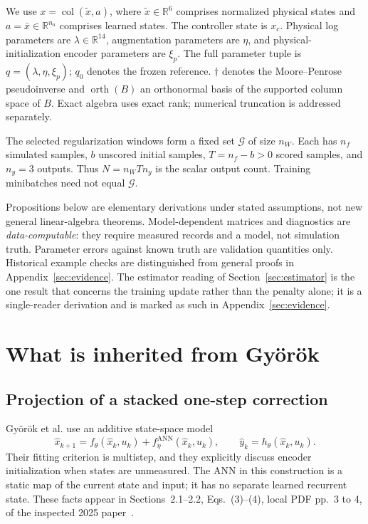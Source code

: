 \documentclass[11pt,a4paper]{article}
\newcommand{\R}{\mathbb R}
\newcommand{\orth}{\operatorname{orth}}
\newcommand{\col}{\operatorname{col}}
\theoremstyle{remark}
\begin{document}
We use $x=\col(\tilde x,a)$, where $\tilde x\in\R^6$ comprises normalized physical states and $a=\bar x\in\R^{n_a}$ comprises learned states. The controller state is $x_c$. Physical log parameters are $\lambda\in\R^{14}$, augmentation parameters are $\eta$, and physical-initialization encoder parameters are $\xi_p$. The full parameter tuple is $q=(\lambda,\eta,\xi_p)$; $q_0$ denotes the frozen reference. $\dagger$ denotes the Moore--Penrose pseudoinverse and $\orth(B)$ an orthonormal basis of the supported column space of $B$. Exact algebra uses exact rank; numerical truncation is addressed separately.

The selected regularization windows form a fixed set $\mathcal G$ of size $n_W$. Each has $n_f$ simulated samples, $b$ unscored initial samples, $T=n_f-b>0$ scored samples, and $n_y=3$ outputs. Thus $N=n_W Tn_y$ is the scalar output count. Training minibatches need not equal $\mathcal G$.

Propositions below are elementary derivations under stated assumptions, not new general linear-algebra theorems. Model-dependent matrices and diagnostics are \emph{data-computable}: they require measured records and a model, not simulation truth. Parameter errors against known truth are validation quantities only. Historical example checks are distinguished from general proofs in Appendix~\ref{sec:evidence}. The estimator reading of Section~\ref{sec:estimator} is the one result that concerns the training update rather than the penalty alone; it is a single-reader derivation and is marked as such in Appendix~\ref{sec:evidence}.

\section{What is inherited from Gy\"or\"ok}
\subsection{Projection of a stacked one-step correction}
Gy\"or\"ok et al. use an additive state-space model
\begin{equation}\label{eq:original-model}
 \hat x_{k+1}=f_\theta(\hat x_k,u_k)+f^{\mathrm{ANN}}_\eta(\hat x_k,u_k),
 \qquad \hat y_k=h_\theta(\hat x_k,u_k).
\end{equation}
Their fitting criterion is multistep, and they explicitly discuss encoder initialization when states are unmeasured. The ANN in this construction is a static map of the current state and input; it has no separate learned recurrent state. These facts appear in Sections~2.1--2.2, Eqs.~(3)--(4), local PDF pp.~3 to 4, of the inspected 2025 paper~\cite{gyorok2025}.
\end{document}
